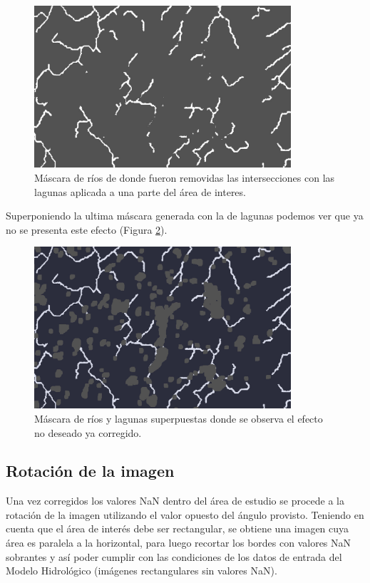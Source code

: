 \documentclass[10pt,a4paper, twoside]{report}
\begin{document}
\begin{figure}[H]
   \centering      
   \includegraphics[width=0.85\textwidth]{imagenes/riversSinLagunas.jpg}
 \caption{Máscara de ríos de donde fueron removidas las intersecciones con las lagunas aplicada a una parte del área de interes.}
 \label{riversSinLagunas}
\end{figure}

Superponiendo la ultima máscara generada con la de lagunas podemos ver que ya no se presenta este efecto (Figura \ref{riversYLagunas}).

\begin{figure}[H]
   \centering      
   \includegraphics[width=0.85\textwidth]{imagenes/riversYLagunas.jpg}
 \caption{Máscara de ríos y lagunas superpuestas donde se observa el efecto no deseado ya corregido.}
 \label{riversYLagunas}
\end{figure}

\subsection{Rotación de la imagen}

Una vez corregidos los valores NaN dentro del área de estudio se procede a la rotación de la imagen utilizando el valor opuesto del ángulo provisto. Teniendo en cuenta que el área de interés debe ser rectangular, se obtiene una imagen cuya área es paralela a la horizontal, para luego recortar los bordes con valores NaN sobrantes y así poder cumplir con las condiciones de los datos de entrada del Modelo Hidrológico (imágenes rectangulares sin valores NaN).
\end{document}
